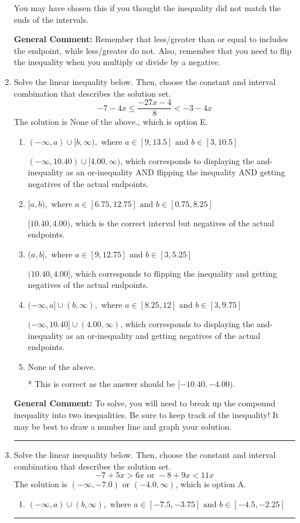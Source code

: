 \documentclass{extbook}[14pt]
\newcommand{\litem}[1]{\item #1

\rule{\textwidth}{0.4pt}}
\begin{document}
\begin{enumerate}
{\begin{enumerate}[label=\Alph*.]
You may have chosen this if you thought the inequality did not match the ends of the intervals.
\end{enumerate}

\textbf{General Comment:} Remember that less/greater than or equal to includes the endpoint, while less/greater do not. Also, remember that you need to flip the inequality when you multiply or divide by a negative.
}
\litem{
Solve the linear inequality below. Then, choose the constant and interval combination that describes the solution set.
\[ -7 - 4 x \leq \frac{-27 x - 4}{8} < -3 - 4 x \]The solution is \( \text{None of the above.} \), which is option E.\begin{enumerate}[label=\Alph*.]
\item \( (-\infty, a) \cup [b, \infty), \text{ where } a \in [9, 13.5] \text{ and } b \in [3, 10.5] \)

$(-\infty, 10.40) \cup [4.00, \infty)$, which corresponds to displaying the and-inequality as an or-inequality AND flipping the inequality AND getting negatives of the actual endpoints.
\item \( [a, b), \text{ where } a \in [6.75, 12.75] \text{ and } b \in [0.75, 8.25] \)

$[10.40, 4.00)$, which is the correct interval but negatives of the actual endpoints.
\item \( (a, b], \text{ where } a \in [9, 12.75] \text{ and } b \in [3, 5.25] \)

$(10.40, 4.00]$, which corresponds to flipping the inequality and getting negatives of the actual endpoints.
\item \( (-\infty, a] \cup (b, \infty), \text{ where } a \in [8.25, 12] \text{ and } b \in [3, 9.75] \)

$(-\infty, 10.40] \cup (4.00, \infty)$, which corresponds to displaying the and-inequality as an or-inequality and getting negatives of the actual endpoints.
\item \( \text{None of the above.} \)

* This is correct as the answer should be $[-10.40, -4.00)$.
\end{enumerate}

\textbf{General Comment:} To solve, you will need to break up the compound inequality into two inequalities. Be sure to keep track of the inequality! It may be best to draw a number line and graph your solution.
}
\litem{
Solve the linear inequality below. Then, choose the constant and interval combination that describes the solution set.
\[ -7 + 5 x > 6 x \text{ or } -8 + 9 x < 11 x \]The solution is \( (-\infty, -7.0) \text{ or } (-4.0, \infty) \), which is option A.\begin{enumerate}[label=\Alph*.]
\item \( (-\infty, a) \cup (b, \infty), \text{ where } a \in [-7.5, -3.75] \text{ and } b \in [-4.5, -2.25] \)


\end{enumerate}}
\end{enumerate}
\end{document}
